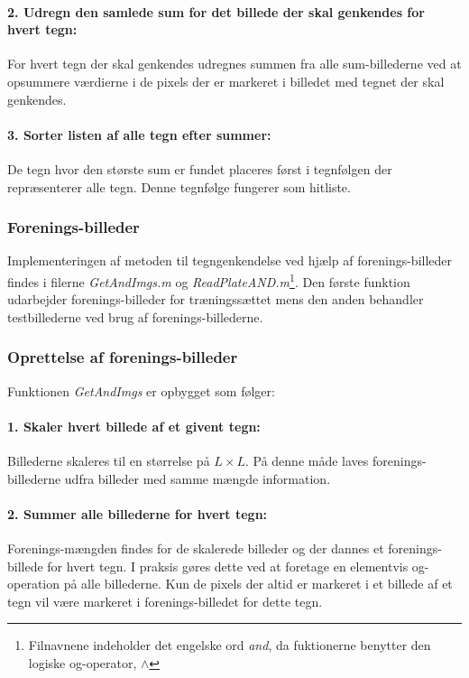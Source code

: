 \paragraph{2. Udregn den samlede sum for det billede der skal genkendes for hvert tegn:} For hvert tegn der skal genkendes udregnes summen fra alle sum-billederne ved at opsummere værdierne i de pixels der er markeret i billedet med tegnet der skal genkendes.

\paragraph{3. Sorter listen af alle tegn efter summer:} De tegn hvor den største sum er fundet placeres først i tegnfølgen der repræsenterer alle tegn. Denne tegnfølge fungerer som hitliste.

\subsubsection{Forenings-billeder}

Implementeringen af metoden til tegngenkendelse ved hjælp af forenings-billeder findes i filerne \textit{GetAndImgs.m} og \textit{ReadPlateAND.m}\footnote{Filnavnene indeholder det engelske ord \textit{and}, da fuktionerne benytter den logiske og-operator, $\wedge$}. Den første funktion udarbejder forenings-billeder for træningssættet mens den anden behandler testbillederne ved brug af forenings-billederne.

\subsubsection*{Oprettelse af forenings-billeder}

Funktionen \textit{GetAndImgs} er opbygget som følger:

\paragraph{1. Skaler hvert billede af et givent tegn:} Billederne skaleres til en størrelse på $L \times L$. På denne måde laves forenings-billederne udfra billeder med samme mængde information.

\paragraph{2. Summer alle billederne for hvert tegn:} Forenings-mængden findes for de skalerede billeder og der dannes et forenings-billede for hvert tegn. I praksis gøres dette ved at foretage en elementvis og-operation på alle billederne. Kun de pixels der altid er markeret i et billede af et tegn vil være markeret i forenings-billedet for dette tegn.


